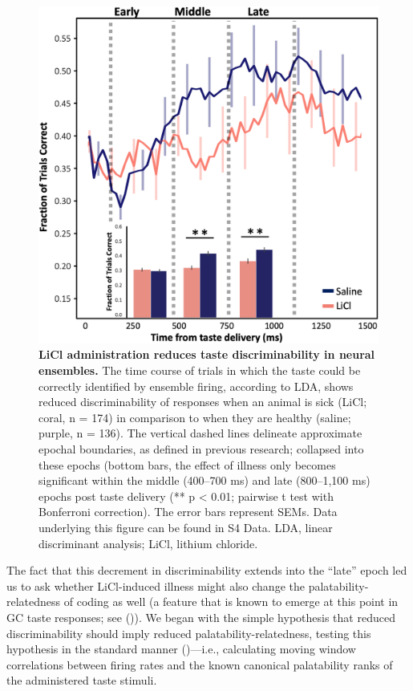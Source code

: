 \begin{refsection}
{\begin{figure}
\includegraphics[width=\linewidth]{stone_2022_figs/journal.pbio.3001537.g005.png} 
\caption{\textbf{LiCl administration reduces taste discriminability in neural ensembles.} The time course of trials in which the taste could be correctly identified by ensemble firing, according to LDA, shows reduced discriminability of responses when an animal is sick (LiCl; coral, n = 174) in comparison to when they are healthy (saline; purple, n = 136). The vertical dashed lines delineate approximate epochal boundaries, as defined in previous research; collapsed into these epochs (bottom bars, the effect of illness only becomes significant within the middle (400–700 ms) and late (800–1,100 ms) epochs post taste delivery (** p < 0.01; pairwise t test with Bonferroni correction). The error bars represent SEMs. Data underlying this figure can be found in S4 Data. LDA, linear discriminant analysis; LiCl, lithium chloride.
}
\label{fig:wrapfig}
\end{figure}


The fact that this decrement in discriminability extends into the “late” epoch led us to ask whether LiCl-induced illness might also change the palatability-relatedness of coding as well (a feature that is known to emerge at this point in GC taste responses; see (\cite{katz-a,katz2001a})). We began with the simple hypothesis that reduced discriminability should imply reduced palatability-relatedness, testing this hypothesis in the standard manner (\cite{sadacca2016a,levitan2019a,li2016a,piette2012a})—i.e., calculating moving window correlations between firing rates and the known canonical palatability ranks of the administered taste stimuli.

}
\end{refsection}
